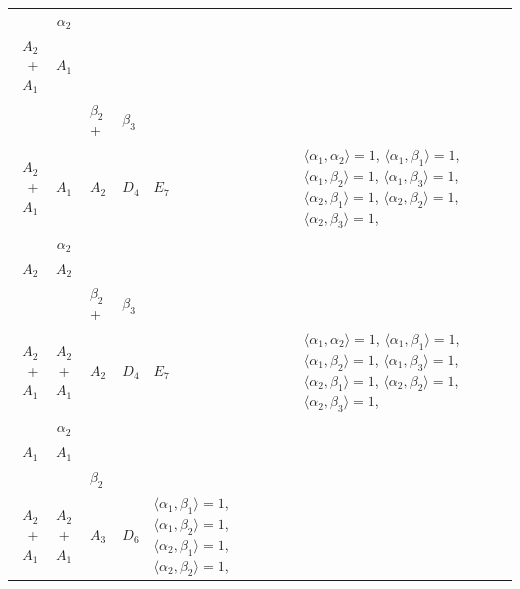 \documentclass[12pt]{report}
\begin{document}
\begin{appendix}
{\begin{longtable}{rcl p{1cm}p{1cm}p{3cm} }
\\
\begin{tabular}{cc}$\alpha_1$+ & $\alpha_2$\\\tiny{ $A_2$+$A_1$ } & \tiny{ $A_1$ }\end{tabular} &\begin{tabular}{c} = \\~ \end{tabular} & \begin{tabular}{ccc}$\beta_1$+ & $\beta_2$+ & $\beta_3$\\\tiny{ $A_2$+$A_1$ } & \tiny{ $A_1$ } & \tiny{ $A_2$ }\end{tabular} & $D_4$ & $E_7$ & $\langle\alpha_1, \alpha_2\rangle=1$,  $\langle\alpha_1, \beta_1\rangle=1$, $\langle\alpha_1, \beta_2\rangle=1$, $\langle\alpha_1, \beta_3\rangle=1$, $\langle\alpha_2, \beta_1\rangle=1$, $\langle\alpha_2, \beta_2\rangle=1$, $\langle\alpha_2, \beta_3\rangle=1$, 
\\
\begin{tabular}{cc}$\alpha_1$+ & $\alpha_2$\\\tiny{ $A_2$ } & \tiny{ $A_2$ }\end{tabular} &\begin{tabular}{c} = \\~ \end{tabular} & \begin{tabular}{ccc}$\beta_1$+ & $\beta_2$+ & $\beta_3$\\\tiny{ $A_2$+$A_1$ } & \tiny{ $A_2$+$A_1$ } & \tiny{ $A_2$ }\end{tabular} & $D_4$ & $E_7$ & $\langle\alpha_1, \alpha_2\rangle=1$,  $\langle\alpha_1, \beta_1\rangle=1$, $\langle\alpha_1, \beta_2\rangle=1$, $\langle\alpha_1, \beta_3\rangle=1$, $\langle\alpha_2, \beta_1\rangle=1$, $\langle\alpha_2, \beta_2\rangle=1$, $\langle\alpha_2, \beta_3\rangle=1$, 
\\
\begin{tabular}{cc}$\alpha_1$+ & $\alpha_2$\\\tiny{ $A_1$ } & \tiny{ $A_1$ }\end{tabular} &\begin{tabular}{c} = \\~ \end{tabular} & \begin{tabular}{cc}$\beta_1$+ & $\beta_2$\\\tiny{ $A_2$+$A_1$ } & \tiny{ $A_2$+$A_1$ }\end{tabular} & $A_3$ & $D_6$ &  $\langle\alpha_1, \beta_1\rangle=1$, $\langle\alpha_1, \beta_2\rangle=1$, $\langle\alpha_2, \beta_1\rangle=1$, $\langle\alpha_2, \beta_2\rangle=1$, 

\end{longtable}}
\end{appendix}
\end{document}

